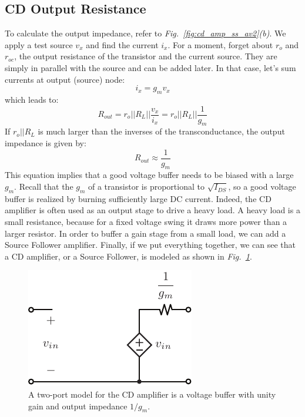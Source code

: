 \subsection{CD Output Resistance}
To calculate the output impedance, refer to \emph{Fig.~\ref{fig:cd_amp_ss_av2}(b)}.  We apply a test source $v_x$ and find the current $i_x$.  For a moment, forget about $r_o$ and $r_{oc}$, the output resistance of the transistor and the current source.  They are simply in parallel with the source and can be added later.  In that case, let's sum currents at output (source) node:
    \begin{equation}
        {i_x} = {g_m}{v_x}
    \end{equation}
which leads to:
    \begin{equation}
        {R_{out}} = {r_o}||{R_L}||\frac{{{v_x}}}{{{i_x}}} = {r_o}||{R_L}||\frac{1}{g_m}
    \end{equation}
If $r_o || R_L$ is much larger than the inverses of the transconductance, the output impedance is given by:
    \begin{equation}
        {R_{out}} \approx \frac{1}{{{g_m}}}
    \end{equation}
This equation implies that a good voltage buffer needs to be biased with a large $g_m$.  Recall that the $g_m$ of a transistor is proportional to $\sqrt{I_{DS}}$, so a good voltage buffer is realized by burning sufficiently large DC current.  Indeed, the CD amplifier is often used as an output stage to drive a heavy load.  A heavy load is a small resistance, because for a fixed voltage swing it draws more power than a larger resistor.  In order to buffer a gain stage from a small load, we can add a Source Follower amplifier.
Finally, if we put everything together, we can see that a CD amplifier, or a Source Follower, is modeled as shown in \emph{Fig.~\ref{fig:cd_amp_model}}.  
\begin{figure}[tb]
\centering
\includegraphics[scale=1]{cd_amp_model}
\caption{A two-port model for the CD amplifier is a voltage buffer with unity gain and output impedance $1/g_m$.}
\label{fig:cd_amp_model}
\end{figure}
